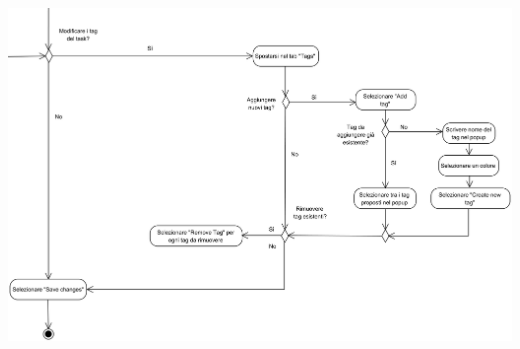 \begin{center}
	\includegraphics[width=15cm]{../../documenti/NormeDiProgetto/DiagrammiProcedure/EditTask5.png}
\end{center}

